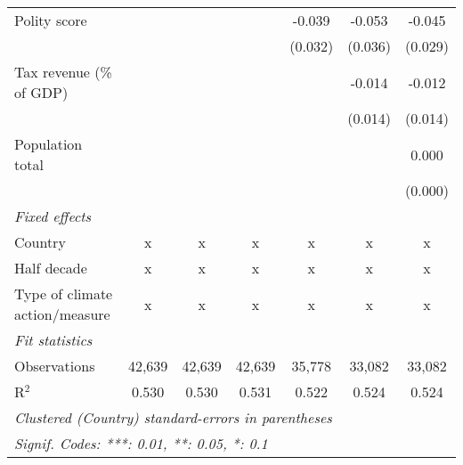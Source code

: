 \begin{tabular}{lcccccc}
   Polity score                                                  &         &              &               & -0.039        & -0.053        & -0.045\\   
                                                                 &         &              &               & (0.032)       & (0.036)       & (0.029)\\   
   Tax revenue (\% of GDP)                                       &         &              &               &               & -0.014        & -0.012\\   
                                                                 &         &              &               &               & (0.014)       & (0.014)\\   
   Population total                                              &         &              &               &               &               & 0.000\\   
                                                                 &         &              &               &               &               & (0.000)\\   
   \emph{Fixed effects}\\
   Country                                                       & x       & x            & x             & x             & x             & x\\  
   Half decade                                                   & x       & x            & x             & x             & x             & x\\  
   Type of climate action/measure                                & x       & x            & x             & x             & x             & x\\  
   \midrule \emph{Fit statistics}\\
   Observations                                                  & 42,639  & 42,639       & 42,639        & 35,778        & 33,082        & 33,082\\  
   R$^2$                                                         & 0.530   & 0.530        & 0.531         & 0.522         & 0.524         & 0.524\\  
   \midrule
   \multicolumn{7}{l}{\emph{Clustered (Country) standard-errors in parentheses}}\\
   \multicolumn{7}{l}{\emph{Signif. Codes: ***: 0.01, **: 0.05, *: 0.1}}\\
\end{tabular}
\par\endgroup


